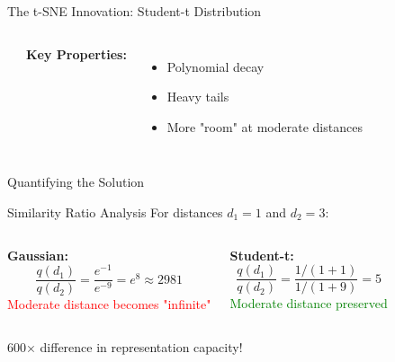 \begin{frame}{The t-SNE Innovation: Student-t Distribution}
\begin{columns}
\begin{center}
\end{center}

\textbf{Key Properties:}
\begin{itemize}
\item Polynomial decay
\item Heavy tails
\item More "room" at moderate distances
\end{itemize}

\vspace{0.5cm}
\end{columns}
\end{frame}

\begin{frame}{Quantifying the Solution}
\begin{block}{Similarity Ratio Analysis}
For distances $d_1 = 1$ and $d_2 = 3$:
  \end{block}

\begin{columns}
\textbf{Gaussian:}
$$\frac{q(d_1)}{q(d_2)} = \frac{e^{-1}}{e^{-9}} = e^8 \approx 2981$$
  \textcolor{red}{Moderate distance becomes "infinite"}

\textbf{Student-t:}
$$\frac{q(d_1)}{q(d_2)} = \frac{1/(1+1)}{1/(1+9)} = 5$$
  \textcolor{green}{Moderate distance preserved}
\end{columns}

\vspace{0.5cm}
\begin{center}
\colorbox{yellow!30}{\Large 600× difference in representation capacity!}
\end{center}
\end{frame}

